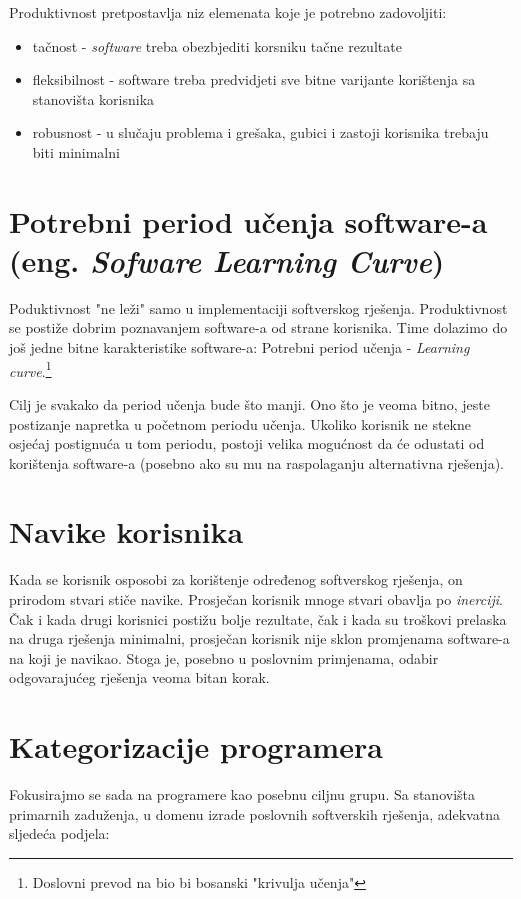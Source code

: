 \documentclass[times, utf8, seminar]{fit}
\begin{document}
Produktivnost pretpostavlja niz elemenata koje je potrebno zadovoljiti:
\begin{itemize}
  \item tačnost - \emph{software} treba obezbjediti korsniku tačne rezultate
  \item fleksibilnost - software treba predvidjeti sve bitne varijante korištenja sa stanovišta korisnika
  \item robusnost - u slučaju problema i grešaka, gubici i zastoji korisnika trebaju biti minimalni
\end{itemize}

\section{Potrebni period učenja software-a (eng. \emph{Sofware Learning Curve})}

Poduktivnost "ne leži" samo u implementaciji softverskog rješenja. Produktivnost se postiže dobrim poznavanjem software-a od strane korisnika. Time dolazimo do još jedne bitne karakteristike software-a: Potrebni period učenja - \emph{Learning curve}.\footnote{Doslovni prevod na bio bi bosanski "krivulja učenja"}

Cilj je svakako da period učenja bude što manji. Ono što je veoma bitno, jeste postizanje napretka u početnom periodu učenja. Ukoliko korisnik ne stekne osjećaj postignuća u tom periodu, postoji velika mogućnost da će odustati od korištenja software-a (posebno ako su mu na raspolaganju alternativna rješenja).

\section{Navike korisnika}

Kada se korisnik osposobi za korištenje određenog softverskog rješenja, on prirodom stvari stiče navike. Prosječan korisnik mnoge stvari obavlja po \emph{inerciji}. Čak i kada drugi korisnici postižu bolje rezultate, čak i kada su troškovi prelaska na druga rješenja minimalni, prosječan korisnik nije sklon promjenama software-a na koji je navikao. Stoga je, posebno u poslovnim primjenama, odabir odgovarajućeg rješenja veoma bitan korak.

\section{Kategorizacije programera}

Fokusirajmo se sada na programere kao posebnu ciljnu grupu. Sa stanovišta primarnih zaduženja, u domenu izrade poslovnih softverskih rješenja, adekvatna sljedeća podjela:
\end{document}
